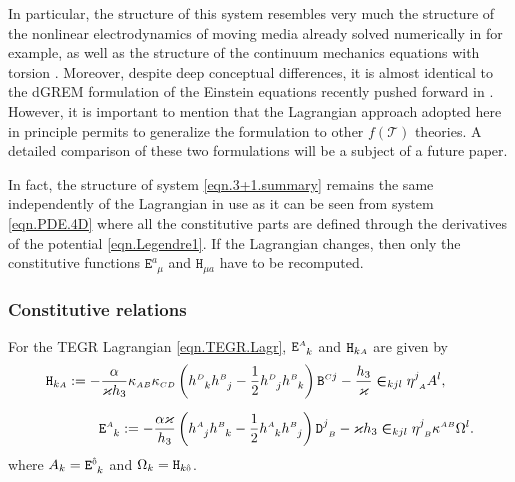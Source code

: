 \documentclass[
10pt, %
a4paper, %
oneside, %
headinclude,footinclude, %
BCOR5mm, %
]{scrartcl}
\newcommand{\sA}{\mathsmaller A}
\newcommand{\sB}{\mathsmaller B}
\newcommand{\sC}{\mathsmaller C}
\newcommand{\sD}{\mathsmaller D}
\newcommand{\mg}[1]{\kappa_{#1}}			%
\newcommand{\MG}[1]{\kappa^{#1}}			%
\newcommand{\tetrsymbol}{h}
\newcommand{\itetrsymbol}{\eta}
\newcommand{\itetr}[2]{\itetrsymbol^{#1}_{\phantom{#1}#2}}
\newcommand{\tetr}[2]{\tetrsymbol^{#1}_{\phantom{#1}#2}}
\newcommand{\detTetr}{\tetrsymbol}
\newcommand{\Dfin}[2]{\mathtt{D}_{\phantom{#2}#1}^{#2}}	%
\newcommand{\Hfin}[2]{\mathtt{H}_{#2#1}}	%
\newcommand{\Efin}[2]{\mathtt{E}^{#1}_{\phantom{#1}#2}}	%
\newcommand{\Ufin}{\mathtt{U}}
\newcommand{\Bfin}[2]{\mathtt{B}^{#1#2}}	%
\newcommand{\LCsymb}{\bm{\in}}    %
\newcommand{\indalg}[1]{\hat{\mathsmaller{#1}}}
\newcommand{\Tscal}{\mathcal{T}}		%
\begin{document}
In particular, the structure of this system resembles very much the structure of the nonlinear 
electrodynamics of 
moving media already solved numerically in \cite{DPRZ2017} for example, as well as the structure of 
the continuum mechanics
equations with torsion \cite{Torsion2019}. Moreover,
despite deep conceptual differences,
it is almost identical to 
the dGREM formulation of the Einstein equations recently pushed forward in \cite{Olivares2022}.
However, it is important to mention that the Lagrangian approach adopted here
in principle permits to generalize the formulation to other $f(\Tscal)$ theories.
A detailed comparison of 
these two formulations will be a subject of a future paper.

In fact, the structure of system \eqref{eqn.3+1.summary} remains the same independently of the 
Lagrangian in use as it can be seen from system \eqref{eqn.PDE.4D} where all the constitutive parts 
are 
defined through the derivatives of the potential \eqref{eqn.Legendre1}. If the Lagrangian changes, 
then only the constitutive functions $ \Efin{a}{\mu} $ and $ \Hfin{a}{\mu} $ have to be recomputed.

\subsubsection{Constitutive relations}

For the TEGR Lagrangian \eqref{eqn.TEGR.Lagr}, $ \Efin{\sA}{k} $ and $ \Hfin{\sA}{k} $ are given by
\begin{subequations}\label{eqn.H.E}
	\begin{align}
		\Hfin{\sA}{k} := %
		-\frac{\alpha}{\varkappa \detTetr_3} 
		\mg{\sA\sB}\mg{\sC\sD} 
		& \left( \tetr{\sD}{k} \tetr{\sB}{j} - \frac12 \tetr{\sD}{j} \tetr{\sB}{k} \right) 
		\Bfin{\sC}{j}
		- 
		\frac{\detTetr_3}{\varkappa} \LCsymb_{kjl} \itetr{j}{\sA} A^l
		,\\[2mm]
		\Efin{\sA}{k} := %
		-\frac{\alpha \varkappa}{\detTetr_3} 
		& \left( \tetr{\sA}{j} \tetr{\sB}{k} - \frac12 \tetr{\sA}{k} \tetr{\sB}{j} \right) 
		\Dfin{\sB}{j} 
		- 
		\varkappa \detTetr_3 \LCsymb_{kjl} 
		\itetr{j}{\sB} \MG{\sA\sB} \Omega^l.
		\label{eqn.E}
	\end{align}
\end{subequations}
where $ A_k = \Efin{\indalg{0}}{k} $ and $ \Omega_k =\Hfin{\indalg{0}}{k}$.
\end{document}
